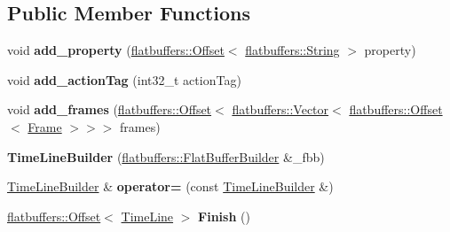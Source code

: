 \subsection*{Public Member Functions}
\begin{DoxyCompactItemize}
\item 
\mbox{\label{structflatbuffers_1_1TimeLineBuilder_a74518df34b793a8de3f843ea54853b0a}} 
void {\bfseries add\+\_\+property} (\hyperlink{structflatbuffers_1_1Offset}{flatbuffers\+::\+Offset}$<$ \hyperlink{structflatbuffers_1_1String}{flatbuffers\+::\+String} $>$ property)
\item 
\mbox{\label{structflatbuffers_1_1TimeLineBuilder_a75d9917fbcc018ecc9ed731b9d4cf460}} 
void {\bfseries add\+\_\+action\+Tag} (int32\+\_\+t action\+Tag)
\item 
\mbox{\label{structflatbuffers_1_1TimeLineBuilder_a66db3b559cfe477d0bb61375aa49ee50}} 
void {\bfseries add\+\_\+frames} (\hyperlink{structflatbuffers_1_1Offset}{flatbuffers\+::\+Offset}$<$ \hyperlink{classflatbuffers_1_1Vector}{flatbuffers\+::\+Vector}$<$ \hyperlink{structflatbuffers_1_1Offset}{flatbuffers\+::\+Offset}$<$ \hyperlink{structflatbuffers_1_1Frame}{Frame} $>$$>$$>$ frames)
\item 
\mbox{\label{structflatbuffers_1_1TimeLineBuilder_ab8be89ffca1582addcc4e490d389230e}} 
{\bfseries Time\+Line\+Builder} (\hyperlink{classflatbuffers_1_1FlatBufferBuilder}{flatbuffers\+::\+Flat\+Buffer\+Builder} \&\+\_\+fbb)
\item 
\mbox{\label{structflatbuffers_1_1TimeLineBuilder_abde72ba7da6b7bd59587f1ef6efdb628}} 
\hyperlink{structflatbuffers_1_1TimeLineBuilder}{Time\+Line\+Builder} \& {\bfseries operator=} (const \hyperlink{structflatbuffers_1_1TimeLineBuilder}{Time\+Line\+Builder} \&)
\item 
\mbox{\label{structflatbuffers_1_1TimeLineBuilder_a85cff8ec8fcb03af22e418a146151faf}} 
\hyperlink{structflatbuffers_1_1Offset}{flatbuffers\+::\+Offset}$<$ \hyperlink{structflatbuffers_1_1TimeLine}{Time\+Line} $>$ {\bfseries Finish} ()
\item 

\end{DoxyCompactItemize}
